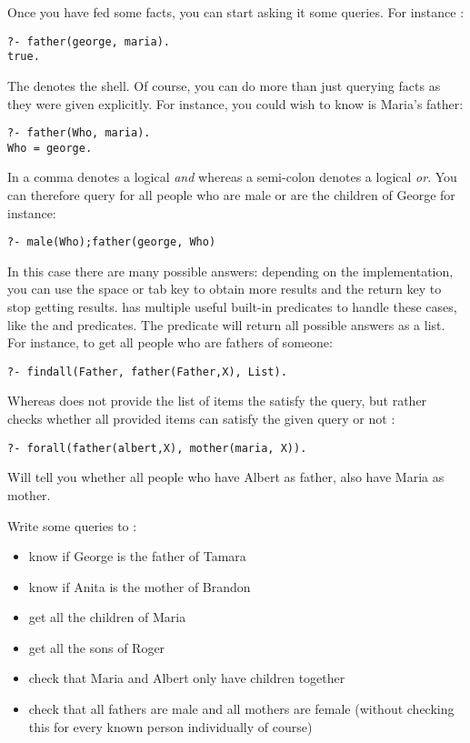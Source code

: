 \documentclass{../../../tp}
\begin{document}
Once you have fed \prolog some facts, you can start asking it some queries. For instance :

\begin{verbatim}
?- father(george, maria).
true.
\end{verbatim}

The  denotes the \prolog shell. Of course, you can do more than just querying facts as they were given explicitly. For instance, you could wish to know is Maria's father:

\begin{verbatim}
?- father(Who, maria).
Who = george.
\end{verbatim}

In \prolog a comma \prologcode{,} denotes a logical \emph{and} whereas a semi-colon denotes a logical \emph{or}. You can therefore query for all people who are male or are the children of George for instance:

\begin{verbatim}
?- male(Who);father(george, Who)
\end{verbatim}

In this case there are many possible answers: depending on the implementation, you can use the space or tab key to obtain more results and the return key to stop getting results. \prolog has multiple useful built-in predicates to handle these cases, like the  and  predicates. The  predicate will return all possible answers as a list. For instance, to get all people who are fathers of someone:

\begin{verbatim}
?- findall(Father, father(Father,X), List).
\end{verbatim}

Whereas  does not provide the list of items the satisfy the query, but rather checks whether all provided items can satisfy the given query or not :

\begin{verbatim}
?- forall(father(albert,X), mother(maria, X)).
\end{verbatim}

Will tell you whether all people who have Albert as father, also have Maria as mother.

\begin{instruction}
	Write some queries to :
	\begin{itemize}
		\item know if George is the father of Tamara
		\item know if Anita is the mother of Brandon
		\item get all the children of Maria
		\item get all the sons of Roger
		\item check that Maria and Albert only have children together
		\item check that all fathers are male and all mothers are female (without checking this for every known person individually of course)
	\end{itemize}
\end{instruction}
\end{document}

